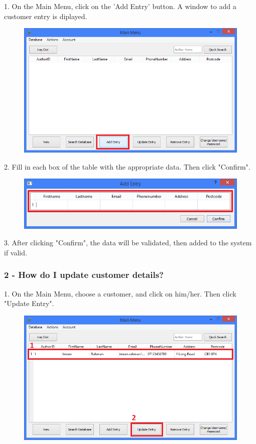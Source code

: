 1. On the Main Menu, click on the 'Add Entry' button. A window to add a customer entry is diplayed.

\begin{figure}[H]
    \includegraphics[width=\textwidth]{./Manual/Tutorial/Q1/AddEntryHighlighted.png}
\end{figure}


2. Fill in each box of the table with the appropriate data. Then click "Confirm".

\begin{figure}[H]
    \includegraphics[width=\textwidth]{./Manual/Tutorial/Q1/AddingEntry.png}
\end{figure}

3. After clicking "Confirm", the data will be validated, then added to the system if valid.

\subsubsection{2 -  How do I update customer details?}

1. On the Main Menu, choose a customer, and click on him/her. Then click "Update Entry".

\begin{figure}[H]
    \includegraphics[width=\textwidth]{./Manual/Tutorial/Q2/SelectingEntry.png}
\end{figure}

